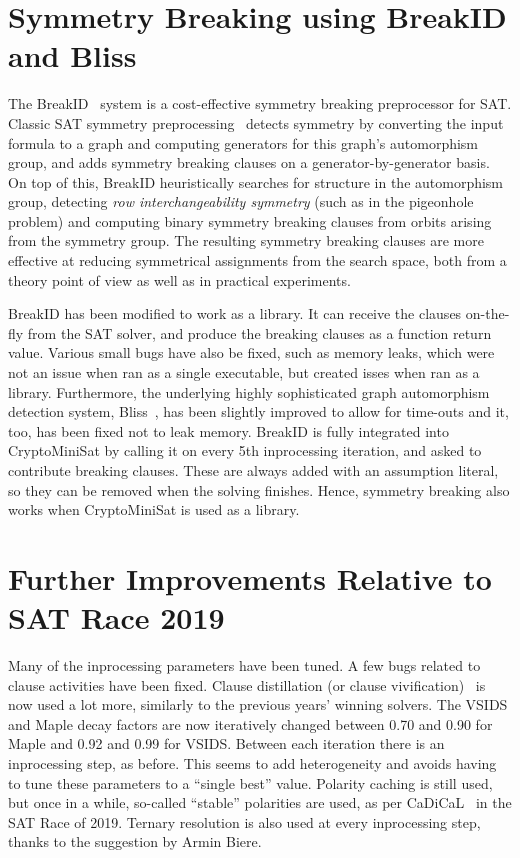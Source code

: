 \documentclass[final]{ieee}
\begin{document}
\section{Symmetry Breaking using BreakID and Bliss}
The BreakID~\cite{breakid2016} system is a cost-effective symmetry breaking preprocessor for SAT.
Classic SAT symmetry preprocessing~\cite{shatter2006} detects symmetry by converting the input formula to a graph and computing generators for this graph's automorphism group, and adds symmetry breaking clauses on a generator-by-generator basis.
On top of this, BreakID heuristically searches for structure in the automorphism group, detecting \emph{row interchangeability symmetry} (such as in the pigeonhole problem) and computing binary symmetry breaking clauses from orbits arising from the symmetry group.
The resulting symmetry breaking clauses are more effective at reducing symmetrical assignments from the search space, both from a theory point of view as well as in practical experiments.

BreakID has been modified to work as a library. It can receive the clauses on-the-fly from the SAT solver, and produce the breaking clauses as a function return value. Various small bugs have also be fixed, such as memory leaks, which were not an issue when ran as a single executable, but created isses when ran as a library. Furthermore, the underlying highly sophisticated graph automorphism detection system, Bliss~\cite{DBLP:conf/alenex/JunttilaK07}, has been slightly improved to allow for time-outs and it, too, has been fixed not to leak memory. BreakID is fully integrated into CryptoMiniSat by calling it on every 5th inprocessing iteration, and asked to contribute breaking clauses. These are always added with an assumption literal, so they can be removed when the solving finishes. Hence, symmetry breaking also works when CryptoMiniSat is used as a library.


\section{Further Improvements Relative to SAT Race 2019}
Many of the inprocessing parameters have been tuned. A few bugs related to clause activities have been fixed. Clause distillation (or clause vivification)~\cite{DBLP:journals/ai/LiXLMLL20} is now used a lot more, similarly to the previous years' winning solvers. The VSIDS and Maple decay factors are now iteratively changed between 0.70 and 0.90 for Maple and 0.92 and 0.99 for VSIDS. Between each iteration there is an inprocessing step, as before. This seems to add heterogeneity and avoids having to tune these parameters to a ``single best'' value. Polarity caching is still used, but once in a while, so-called ``stable'' polarities are used, as per CaDiCaL~\cite{cadical} in the SAT Race of 2019. Ternary resolution is also used at every inprocessing step, thanks to the suggestion by Armin Biere.
\end{document}
